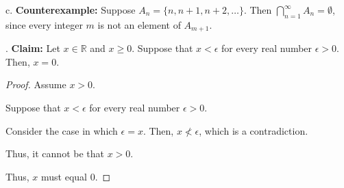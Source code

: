 \documentclass[12pt]{article}
\begin{document}
\medskip
\noindent c. {\bf Counterexample:} Suppose $A_n = \{n,n+1,n+2,\hdots\}$. Then  $\bigcap\limits_{n=1}^\infty A_n =\emptyset$, since every integer $m$ is not an element of $A_{m+1}$.

\bigskip
{}. {\bf Claim:} Let $x \in \mathbb R$ and $x \geq 0$. Suppose that $x < \epsilon$ for every real number $\epsilon > 0$. Then, $x = 0$.

\begin{proof}
    Assume $x > 0$.
    
    Suppose that $x < \epsilon$ for every real number $\epsilon > 0$.
    
    Consider the case in which $\epsilon = x$. Then, $x \not < \epsilon$, which is a contradiction.
    
    Thus, it cannot be that $x > 0$.
    
    Thus, $x$ must equal 0.
\end{proof}
\end{document}
